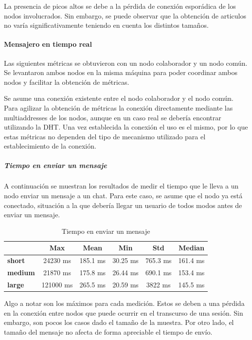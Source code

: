
La presencia de picos altos se debe a la pérdida de conexión esporádica de los nodos involucrados. Sin embargo, se puede observar que la obtención de articulos no varía significativamente teniendo en cuenta los distintos tamaños. 

\paragraph{Mensajero en tiempo real}

Las siguientes métricas se obtuvieron con un nodo colaborador y un nodo común. Se levantaron ambos nodos en la misma máquina para poder coordinar ambos nodos y facilitar la obtención de métricas.

Se asume una conexión existente entre el nodo colaborador y el nodo común. Para agilizar la obtención de métricas la conexión directamente mediante las multiaddresses de los nodos, aunque en un caso real se debería encontrar utilizando la DHT. Una vez establecida la conexión el uso es el mismo, por lo que estas métricas no dependen del tipo de mecanismo utilizado para el establecimiento de la conexión.

\subparagraph{Tiempo en enviar un mensaje}

A continuación se muestran los resultados de medir el tiempo que le lleva a un nodo enviar un mensaje a un chat. Para este caso, se asume que el nodo ya está conectado, situación a la que debería llegar un usuario de todos modos antes de enviar un mensaje.

\setlength\tabcolsep{10pt}
\begin{table}[!htbp]
    \centering
    \begin{tabular}{|l|c|c|c|c|c|}
        \hline
        & \textbf{Max} & \textbf{Mean} & \textbf{Min} & \textbf{Std} & \textbf{Median} \\ \hline
        \textbf{short} & 24230 ms & 185.1 ms & 30.25 ms & 765.3 ms & 161.4 ms \\ \hline
        \textbf{medium} & 21870 ms & 175.8 ms & 26.44 ms & 690.1 ms & 153.4 ms \\ \hline
        \textbf{large} & 121000 ms & 265.5 ms & 20.59 ms & 3822 ms & 145.5 ms \\ \hline
    \end{tabular}
    \caption{Tiempo en enviar un mensaje}
\end{table}

Algo a notar son los máximos para cada medición. Estos se deben a una pérdida en la conexión entre nodos que puede ocurrir en el transcurso de una sesión. Sin embargo, son pocos los casos dado el tamaño de la muestra. Por otro lado, el tamaño del mensaje no afecta de forma apreciable el tiempo de envío.

